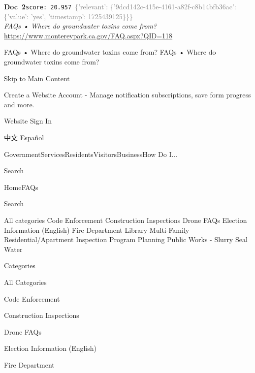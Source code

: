 \documentclass[a4paper,11pt]{article}
\begin{document}
\begin{docenv}
{\footnotesize\textcolor{doccolor}{\textbf{Doc~2}}}\hfill{\tiny\texttt{score:~20.957}}\ {\tiny\textcolor{gray}{\{'relevant': \{'9dcd142c-415e-4161-a82f-c8b14bfb36ac': \{'value': 'yes', 'timestamp': 1725439125\}\}\}}}\\[3pt]
{\small\textit{FAQs • Where do groundwater toxins come from?}}\\[2pt]
{\tiny\url{https://www.montereypark.ca.gov/FAQ.aspx?QID=118}}\\[4pt]
{\footnotesize FAQs • Where do groundwater toxins come from?
FAQs • Where do groundwater toxins come from?

 

Skip to Main Content

Create a Website Account - Manage notification subscriptions, save form progress and more.   

Website Sign In

 

 中文 Español

 
 
 

GovernmentServicesResidentsVisitorsBusinessHow Do I...

 

 

 

 

 

 

 

 

 
 
 

 

Search

 
 
 

 
HomeFAQs

Search

All categories
Code Enforcement
Construction Inspections
Drone FAQs
Election Information (English)
Fire Department
Library
Multi-Family Residential/Apartment Inspection Program
Planning
Public Works - Slurry Seal
Water

Categories

All Categories

Code Enforcement

Construction Inspections

Drone FAQs

Election Information (English)

Fire Department

}
\end{docenv}
\end{document}
